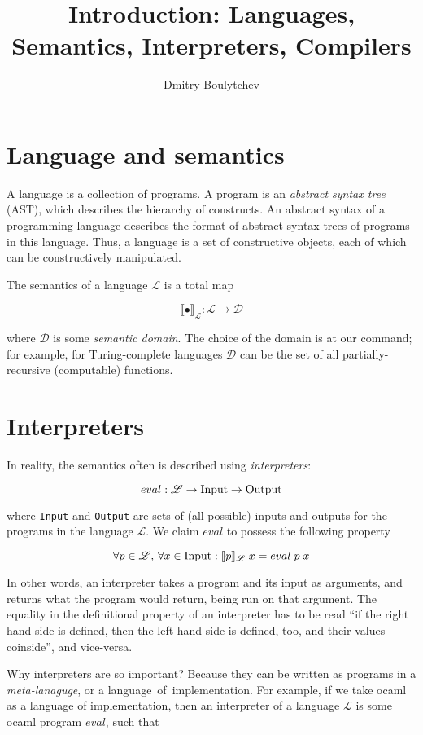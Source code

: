 \documentclass{article}
\title{Introduction: Languages, Semantics, Interpreters, Compilers}
\date{\vspace{-5ex}}
\author{Dmitry Boulytchev}
\newcommand{\sembr}[1]{\llbracket{#1}\rrbracket}
\theoremstyle{definition}
\begin{document}
\maketitle

\section{Language and semantics}

A language is a collection of programs. A program is an \emph{abstract syntax tree} (AST), which describes the hierarchy of constructs. An abstract
syntax of a programming language describes the format of abstract syntax trees of programs in this language. Thus, a language is a set of constructive
objects, each of which can be constructively manipulated.

The semantics of a language $\mathscr L$ is a total map

$$
\sembr{\bullet}_{\mathscr L} : \mathscr L \to \mathscr D
$$

where $\mathscr D$ is some \emph{semantic domain}. The choice of the domain is at our command; for example, for Turing-complete languages $\mathscr D$ can
be the set of all partially-recursive (computable) functions.

\section{Interpreters}

In reality, the semantics often is described using \emph{interpreters}:

$$
eval : \mathscr L \to \mbox{\lstinline|Input|} \to \mbox{\lstinline|Output|}
$$

where \lstinline|Input| and \lstinline|Output| are sets of (all possible) inputs and outputs for the programs in the language $\mathscr L$. We claim $eval$ to
possess the following property

$$
\forall p \in \mathscr L,\, \forall x\in \mbox{\lstinline|Input|} : \sembr{p}_{\mathscr L}\;x = eval\; p\; x
$$

In other words, an interpreter takes a program and its input as arguments, and returns what the program would return, being run on that
argument. The equality in the definitional property of an interpreter has to be read ``if the right hand side is defined, then the left hand side
is defined, too, and their values coinside'', and vice-versa.

Why interpreters are so important? Because they can be written as programs in a \emph{meta-lanaguge}, or a \mbox{language of implementation}. For example,
if we take ocaml as a language of implementation, then an interpreter of a language $\mathscr L$ is some ocaml program $eval$, such that
\end{document}
